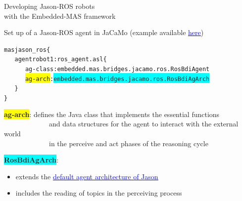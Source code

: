 \documentclass[compress]{beamer}
\newcommand{\link}[2]{\href{#1}{\underline{\textcolor{blue}{#2}}}}
\begin{document}
\begin{frame}[fragile]{Developing Jason-ROS robots\\ {\scriptsize with the Embedded-MAS framework}}
\vspace{1em}
\scriptsize
\begin{block}{Set up of a Jason-ROS agent in JaCaMo {\tiny (example available \link{https://github.com/issia-2026-jason-ros/turtle-example/blob/master/turtle_example.jcm}{here})} }
\vspace{-1em}
  \begin{alltt}\scriptsize
   mas jason\_ros \{  
   \ \ \ agent robot1: ros\_agent.asl \{
   \ \ \ \ \ \ ag-class: embedded.mas.bridges.jacamo.ros.RosBdiAgent
   \ \ \ \ \ \ \colorbox{yellow}{ag-arch}: \colorbox{cyan}{embedded.mas.bridges.jacamo.ros.RosBdiAgArch}
   \ \ \ \}
  \}
  \end{alltt}    
  \vspace{-1.2em}
\end{block}

\footnotesize
\colorbox{yellow}{\bf ag-arch}: defines the Java class that implements the essential functions\\ \ \ \ \ \ \ \ \ \ \ \ \ \ and data structures for the agent to interact with the external world\\ \ \ \ \ \ \ \ \ \ \ \ \ \  {\tiny in the perceive and act phases of the reasoning cycle}

\vspace{.3cm}

\colorbox{cyan}{\bf RosBdiAgArch}: 
\begin{itemize}
 \item extends the \href{https://github.com/jason-lang/jason/blob/main/jason-interpreter/src/main/java/jason/architecture/AgArch.java}{\underline{\textcolor{blue}{default agent architecture of Jason}}}\\
 \item includes the reading of topics in the perceiving process
\end{itemize}


 
\end{frame}
\end{document}
